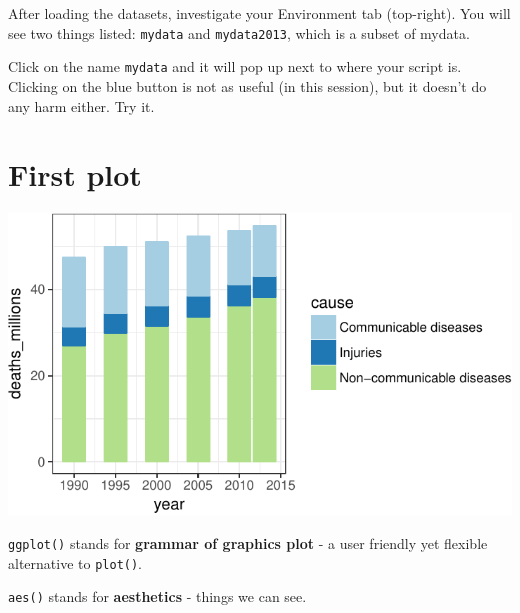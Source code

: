 \documentclass[12pt,]{krantz}
\makeatletter
\newenvironment{Shaded}{\begin{snugshade}}{\end{snugshade}}
\newcommand{\CommentTok}[1]{\textcolor[rgb]{0.56,0.35,0.01}{\textit{#1}}}
\newcommand{\DataTypeTok}[1]{\textcolor[rgb]{0.13,0.29,0.53}{#1}}
\newcommand{\KeywordTok}[1]{\textcolor[rgb]{0.13,0.29,0.53}{\textbf{#1}}}
\newcommand{\NormalTok}[1]{#1}
\newcommand{\OperatorTok}[1]{\textcolor[rgb]{0.81,0.36,0.00}{\textbf{#1}}}
\newcommand{\StringTok}[1]{\textcolor[rgb]{0.31,0.60,0.02}{#1}}
\newenvironment{kframe}{%
\medskip{}
\setlength{\fboxsep}{.8em}
 \def\at@end@of@kframe{}%
 \ifinner\ifhmode%
  \def\at@end@of@kframe{\end{minipage}}%
  \begin{minipage}{\columnwidth}%
 \fi\fi%
 \def\FrameCommand##1{\hskip\@totalleftmargin \hskip-\fboxsep
 \colorbox{shadecolor}{##1}\hskip-\fboxsep
     \hskip-\linewidth \hskip-\@totalleftmargin \hskip\columnwidth}%
 \MakeFramed {\advance\hsize-\width
   \@totalleftmargin\z@ \linewidth\hsize
   \@setminipage}}%
 {\par\unskip\endMakeFramed%
 \at@end@of@kframe}
\renewenvironment{Shaded}{\begin{kframe}}{\end{kframe}}
\theoremstyle{definition}
\theoremstyle{definition}
\theoremstyle{definition}
\theoremstyle{remark}
\makeatother
\begin{document}
After loading the datasets, investigate your Environment tab
(top-right). You will see two things listed: \texttt{mydata} and
\texttt{mydata2013}, which is a subset of mydata.

Click on the name \texttt{mydata} and it will pop up next to where your
script is. Clicking on the blue button is not as useful (in this
session), but it doesn't do any harm either. Try it.

\hypertarget{first-plot}{%
\section{First plot}\label{first-plot}}

\begin{Shaded}
\end{Shaded}

\includegraphics{01_first_interaction_files/figure-latex/unnamed-chunk-2-1.pdf}

\texttt{ggplot()} stands for \textbf{grammar of graphics plot} - a user
friendly yet flexible alternative to \texttt{plot()}.

\texttt{aes()} stands for \textbf{aesthetics} - things we can see.
\end{document}
